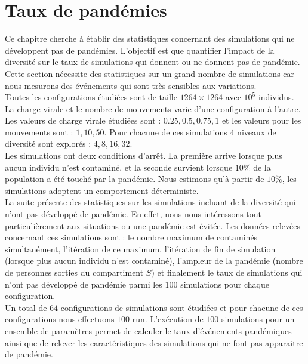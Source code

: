 \section{Taux de pandémies}

Ce chapitre cherche à établir des statistiques concernant des simulations qui ne développent pas de pandémies. L'objectif est que quantifier l'impact de la diversité sur le taux de simulations qui donnent ou ne donnent pas de pandémie. Cette section nécessite des statistiques sur un grand nombre de simulations car nous mesurons des événements qui sont très sensibles aux variations.\\

Toutes les configurations étudiées sont de taille $1264 \times 1264$ avec $10^5$ individus. La charge virale et le nombre de mouvements varie d’une configuration à l’autre. Les valeurs de charge virale étudiées sont : $0.25,0.5,0.75,1$ et les valeurs pour les mouvements sont : $1,10,50$. Pour chacune de ces simulations $4$ niveaux de diversité sont explorés : $4,8,16,32$.\\

Les simulations ont deux conditions d'arrêt. La première arrive lorsque plus aucun individu n'est contaminé, et la seconde survient lorsque $10\%$ de la population a été touché par la pandémie. Nous estimons qu'à partir de $10\%$, les simulations adoptent un comportement déterministe.\\ 

La suite présente des statistiques sur les simulations incluant de la diversité qui n'ont pas développé de pandémie. En effet, nous nous intéressons tout particulièrement aux situations ou une pandémie est évitée. Les données relevées concernant ces simulations sont : le nombre maximum de contaminés simultanément, l'itération de ce maximum, l'itération de fin de simulation (lorsque plus aucun individu n'est contaminé), l'ampleur de la pandémie (nombre de personnes sorties du compartiment $S$) et finalement le taux de simulations qui n'ont pas développé de pandémie parmi les $100$ simulations pour chaque configuration.\\

Un total de $64$ configurations de simulations sont étudiées et pour chacune de ces configurations nous effectuons $100$ run. L'exécution de $100$ simulations pour un ensemble de paramètres permet de calculer le taux d'événements pandémiques ainsi que de relever les caractéristiques des simulations qui ne font pas apparaitre de pandémie.

